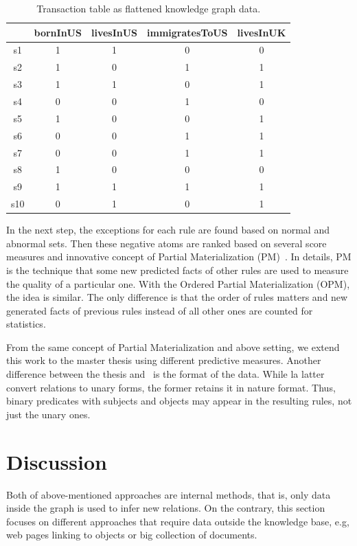 \begin{table}
\begin{center}
\begin{tabular}{|c|c|c|c|c|}
\hline
 & bornInUS & livesInUS & immigratesToUS & livesInUK\\
\hline\hline
s1 & 1 & 1 & 0 & 0\\
\hline
s2 & 1 & 0 & 1 & 1\\
\hline
s3 & 1 & 1 & 0 & 1\\
\hline
s4 & 0 & 0 & 1 & 0\\
\hline
s5 & 1 & 0 & 0 & 1\\
\hline
s6 & 0 & 0 & 1 & 1\\
\hline
s7 & 0 & 0 & 1 & 1\\
\hline
s8 & 1 & 0 & 0 & 0\\
\hline
s9 & 1 & 1 & 1 & 1\\
\hline
s10 & 0 & 1 & 0 & 1\\
\hline
\end{tabular}
\end{center}
\caption{Transaction table as flattened knowledge graph data.}
\label{table2}
\end{table}

In the next step, the exceptions for each rule are found based on normal and abnormal sets. Then these negative atoms are ranked based on several score measures and innovative concept of Partial Materialization (PM)~\cite{ref12}. In details, PM is the technique that some new predicted facts of other rules are used to measure the quality of a particular one. With the Ordered Partial Materialization (OPM), the idea is similar. The only difference is that the order of rules matters and new generated facts of previous rules instead of all other ones are counted for statistics.

From the same concept of Partial Materialization and above setting, we extend this work to the master thesis using different predictive measures. Another difference between the thesis and~\cite{ref12} is the format of the data. While la latter convert relations to unary forms, the former retains it in nature format. Thus, binary predicates with subjects and objects may appear in the resulting rules, not just the unary ones.

\section{Discussion}

Both of above-mentioned approaches are internal methods, that is, only data inside the graph is used to infer new relations. On the contrary, this section focuses on different approaches that require data outside the knowledge base, e.g, web pages linking to objects or big collection of documents.

